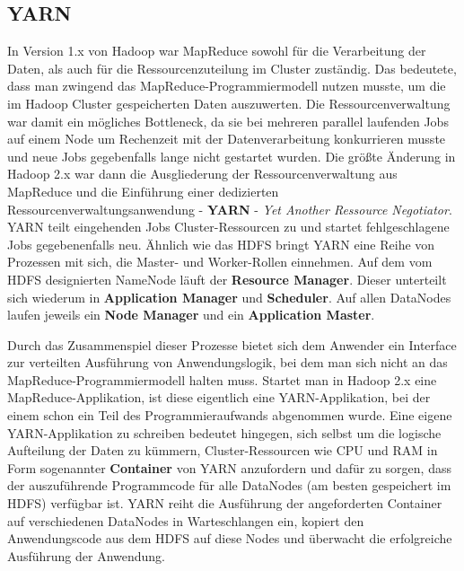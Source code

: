 \subsection{YARN}
In Version 1.x von Hadoop war MapReduce sowohl für die Verarbeitung der Daten, als auch für die Ressourcenzuteilung im Cluster zuständig. Das bedeutete, dass man zwingend das MapReduce-Programmiermodell nutzen musste, um die im Hadoop Cluster gespeicherten Daten auszuwerten. Die Ressourcenverwaltung war damit ein mögliches Bottleneck, da sie bei mehreren parallel laufenden Jobs auf einem Node um Rechenzeit mit der Datenverarbeitung konkurrieren musste und neue Jobs gegebenfalls lange nicht gestartet wurden.\cite{freiknecht_big_2018}
Die größte Änderung in Hadoop 2.x war dann die Ausgliederung der Ressourcenverwaltung aus MapReduce und die Einführung einer dedizierten Ressourcenverwaltungsanwendung - \textbf{YARN} - \textit{Yet Another Ressource Negotiator}. YARN teilt eingehenden Jobs Cluster-Ressourcen zu und startet fehlgeschlagene Jobs gegebenenfalls neu. Ähnlich wie das HDFS bringt YARN eine Reihe von Prozessen mit sich, die Master- und Worker-Rollen einnehmen. Auf dem vom HDFS designierten NameNode läuft der \textbf{Resource Manager}. Dieser unterteilt sich wiederum in \textbf{Application Manager} und \textbf{Scheduler}. Auf allen DataNodes laufen jeweils ein \textbf{Node Manager} und ein \textbf{Application Master}.\cite{freiknecht_big_2018} 
\par
Durch das Zusammenspiel dieser Prozesse bietet sich dem Anwender ein Interface zur verteilten Ausführung von Anwendungslogik, bei dem man sich nicht an das MapReduce-Programmiermodell halten muss. Startet man in Hadoop 2.x eine MapReduce-Applikation, ist diese eigentlich eine YARN-Applikation, bei der einem schon ein Teil des Programmieraufwands abgenommen wurde. Eine eigene YARN-Applikation zu schreiben bedeutet hingegen, sich selbst um die logische Aufteilung der Daten zu kümmern, Cluster-Ressourcen wie CPU und RAM in Form sogenannter \textbf{Container} von YARN anzufordern und dafür zu sorgen, dass der auszuführende Programmcode für alle DataNodes (am besten gespeichert im HDFS) verfügbar ist. YARN reiht die Ausführung der angeforderten Container auf verschiedenen DataNodes in Warteschlangen ein, kopiert den Anwendungscode aus dem HDFS auf diese Nodes und überwacht die erfolgreiche Ausführung der Anwendung. 
  
